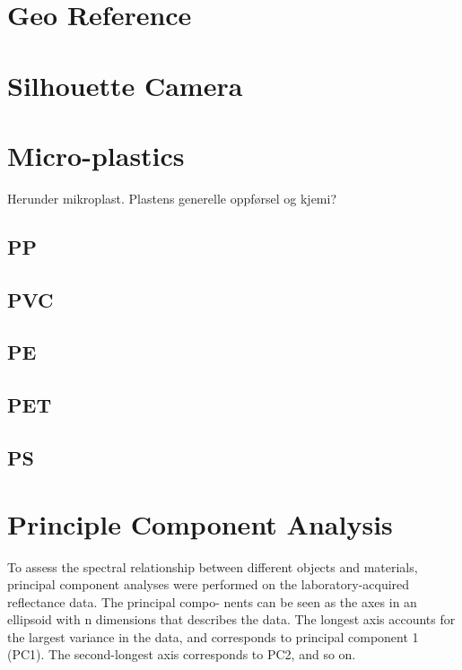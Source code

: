 \section{Geo Reference}


\section{Silhouette Camera}




\section{Micro-plastics}
Herunder mikroplast. Plastens generelle oppførsel og kjemi?
\subsection{PP}
\subsection{PVC}
\subsection{PE}
\subsection{PET}
\subsection{PS}



\section{Principle Component Analysis}

To assess the spectral relationship between different objects and materials, principal component analyses were performed on the laboratory-acquired reflectance data. The principal compo- nents can be seen as the axes in an ellipsoid with n dimensions that describes the data. The longest axis accounts for the largest variance in the data, and corresponds to principal component 1 (PC1). The second-longest axis corresponds to PC2, and so on.


